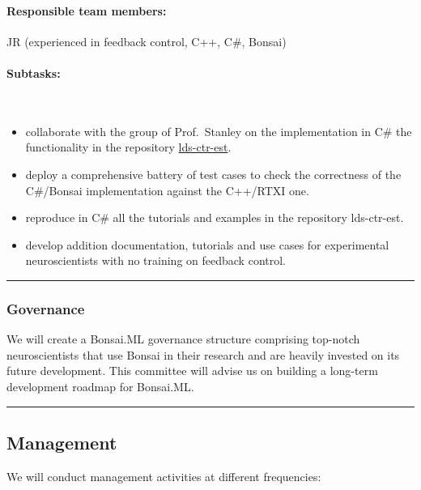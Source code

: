 \paragraph{Responsible team members:} JR (experienced in feedback control, C++,
C\#, Bonsai)

\paragraph{Subtasks:}\mbox{}\\

\begin{itemize}

    \item collaborate with the group of Prof.~Stanley on the implementation in
        C\# the functionality in the repository
        \href{https://github.com/CLOCTools/lds-ctrl-est}{lds-ctr-est}.

    \item deploy a comprehensive battery of test cases to check the correctness
        of the C\#/Bonsai implementation against the C++/RTXI one.

    \item reproduce in C\# all the tutorials and examples in the repository
        lds-ctr-est.

    \item develop addition documentation, tutorials and use cases for
        experimental neuroscientists with no training on feedback control.

\end{itemize}

\noindent\rule{\textwidth}{1pt}
\subsubsection*{Governance}

We will create a Bonsai.ML governance structure comprising top-notch
neuroscientists that use Bonsai in their research and are heavily invested on
its future development.
%
This committee will advise us on building a long-term development roadmap for
Bonsai.ML.

\noindent\rule{\textwidth}{1pt}
\subsection*{Management}

We will conduct management activities at different frequencies:

